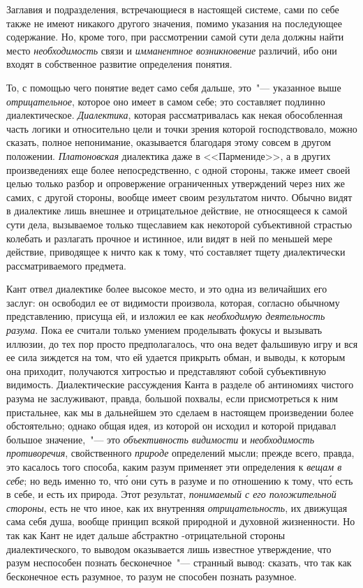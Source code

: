 Заглавия и подразделения, встречающиеся в настоящей
системе, сами по себе также не имеют никакого другого
значения, помимо указания на последующее содержание.
Но, кроме того, при рассмотрении самой сути дела
должны найти место \emph{необходимость} связи и \emph{имманентное
возникновение} различий, ибо они входят в собственное
развитие определения понятия.

То, с помощью чего понятие ведет само себя дальше,
это~"--- указанное выше \emph{отрицательное}, которое оно имеет
в самом себе; это составляет подлинно диалектическое.
\emph{Диалектика}, которая рассматривалась как некая обособленная
часть логики и относительно цели и точки зрения
которой господствовало, можно сказать, полное
непонимание, оказывается благодаря этому совсем в другом
положении. \emph{Платоновская} диалектика даже в <<Пармениде>>,
а в других произведениях еще более непосредственно,
с одной стороны, также имеет своей целью
только разбор и опровержение ограниченных утверждений
через них же самих, с другой стороны, вообще имеет
своим результатом ничто. Обычно видят в диалектике
лишь внешнее и отрицательное действие, не относящееся
к самой сути дела, вызываемое только тщеславием
как некоторой субъективной страстью колебать и разлагать
прочное и истинное, или видят в ней по меньшей
мере действие, приводящее к ничто как к тому, чт\'о составляет
тщету диалектически рассматриваемого предмета.

Кант отвел диалектике более высокое место, и это
одна из величайших его заслуг: он освободил ее от видимости
произвола, которая, согласно обычному представлению,
присуща ей, и изложил ее как \emph{необходимую деятельность
разума}. Пока ее считали только умением проделывать
фокусы и вызывать иллюзии, до тех пор просто
предполагалось, что она ведет фальшивую игру и вся
ее сила зиждется на том, что ей удается прикрыть обман,
и выводы, к которым она приходит, получаются хитростью
и представляют собой субъективную видимость.
Диалектические рассуждения Канта в разделе об антиномиях
чистого разума не заслуживают, правда, большой
похвалы, если присмотреться к ним пристальнее, как мы
в дальнейшем это сделаем в настоящем произведении
более обстоятельно; однако общая идея, из которой он
исходил и которой придавал большое значение,~"--- это
\emph{объективность видимости} и \emph{необходимость противоречия},
свойственного \emph{природе} определений мысли; прежде всего,
правда, это касалось того способа, каким разум применяет
эти определения к \emph{вещам в себе}; но ведь именно то,
чт\'о они суть в разуме и по отношению к тому, чт\'о есть
в себе, и есть их природа. Этот результат, \emph{понимаемый
с его положительной стороны}, есть не что иное, как их
внутренняя \emph{отрицательность}, их движущая сама себя
душа, вообще принцип всякой природной и духовной
жизненности. Но так как Кант не идет дальше абстрактно
-отрицательной стороны диалектического, то выводом
оказывается лишь известное утверждение, что разум неспособен
познать бесконечное~"--- странный вывод: сказать,
что так как бесконечное есть разумное, то разум
не способен познать разумное.

